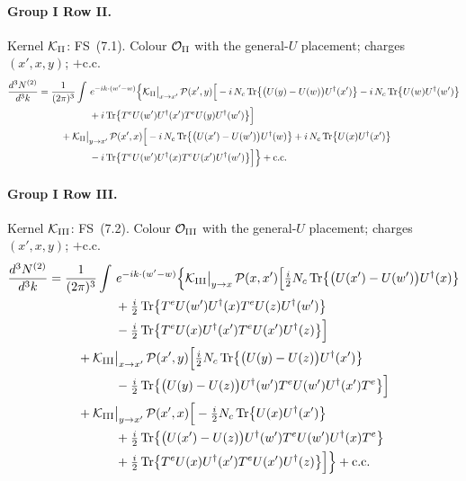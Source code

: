 \documentclass[10pt]{article}
\numberwithin{equation}{section}
\newcommand{\OO}{\mathcal O}
\newcommand{\KK}{\mathcal K}
\newcommand{\PP}{\mathcal P}
\newcommand{\pre}{\frac{1}{(2\pi)^3}}
\newcommand{\phw}{e^{-ik\cdot(w'-w)}}
\begin{document}
\paragraph{Group I Row II.} Kernel $\KK_{\rm II}$: FS~(7.1). Colour $\OO_{\rm II}$ with the general-$U$ placement; charges $(x',x,y)$; $+$c.c.
\begin{align}
\frac{d^3N^{(2)}}{d^3k}={}&\pre\int\,\phw\Big\{\KK_{\rm II}\big|_{x\to x'}\,\PP(x',y)\Big[-i\,N_c\,{\rm Tr}\big\{\big(U(y)-U(w)\big)U^\dagger(x')\big\}-i\,N_c\,{\rm Tr}\big\{U(w)U^\dagger(w')\big\}\notag\\
&\qquad\qquad+i\,{\rm Tr}\big\{T^eU(w')U^\dagger(x')T^eU(y)U^\dagger(w')\big\}\Big]\notag\\
&\quad+\KK_{\rm II}\big|_{y\to x'}\,\PP(x',x)\Big[-i\,N_c\,{\rm Tr}\big\{\big(U(x')-U(w')\big)U^\dagger(w)\big\}+i\,N_c\,{\rm Tr}\big\{U(x)U^\dagger(x')\big\}\notag\\
&\qquad\qquad-i\,{\rm Tr}\big\{T^eU(w')U^\dagger(x)T^eU(x')U^\dagger(w')\big\}\Big]\Big\}+{\rm c.c.}
\end{align}
\paragraph{Group I Row III.} Kernel $\KK_{\rm III}$: FS~(7.2). Colour $\OO_{\rm III}$ with the general-$U$ placement; charges $(x',x,y)$; $+$c.c.
\begin{align}
\frac{d^3N^{(2)}}{d^3k}={}&\pre\int\,\phw\Big\{\KK_{\rm III}\big|_{y\to x}\,\PP(x,x')\Big[\tfrac{i}{2}N_c\,{\rm Tr}\big\{\big(U(x')-U(w')\big)U^\dagger(x)\big\}\notag\\
&\qquad\qquad+\tfrac{i}{2}\,{\rm Tr}\big\{T^eU(w')U^\dagger(x)T^eU(z)U^\dagger(w')\big\}\notag\\
&\qquad\qquad-\tfrac{i}{2}\,{\rm Tr}\big\{T^eU(x)U^\dagger(x')T^eU(x')U^\dagger(z)\big\}\Big]\notag\\
&\quad+\KK_{\rm III}\big|_{x\to x'}\,\PP(x',y)\Big[\tfrac{i}{2}N_c\,{\rm Tr}\big\{\big(U(y)-U(z)\big)U^\dagger(x')\big\}\notag\\
&\qquad\qquad-\tfrac{i}{2}\,{\rm Tr}\big\{\big(U(y)-U(z)\big)U^\dagger(w')T^eU(w')U^\dagger(x')T^e\big\}\Big]\notag\\
&\quad+\KK_{\rm III}\big|_{y\to x'}\,\PP(x',x)\Big[-\tfrac{i}{2}N_c\,{\rm Tr}\big\{U(x)U^\dagger(x')\big\}\notag\\
&\qquad\qquad+\tfrac{i}{2}\,{\rm Tr}\big\{\big(U(x')-U(z)\big)U^\dagger(w')T^eU(w')U^\dagger(x)T^e\big\}\notag\\
&\qquad\qquad+\tfrac{i}{2}\,{\rm Tr}\big\{T^eU(x)U^\dagger(x')T^eU(x')U^\dagger(z)\big\}\Big]\Big\}+{\rm c.c.}
\end{align}
\end{document}
